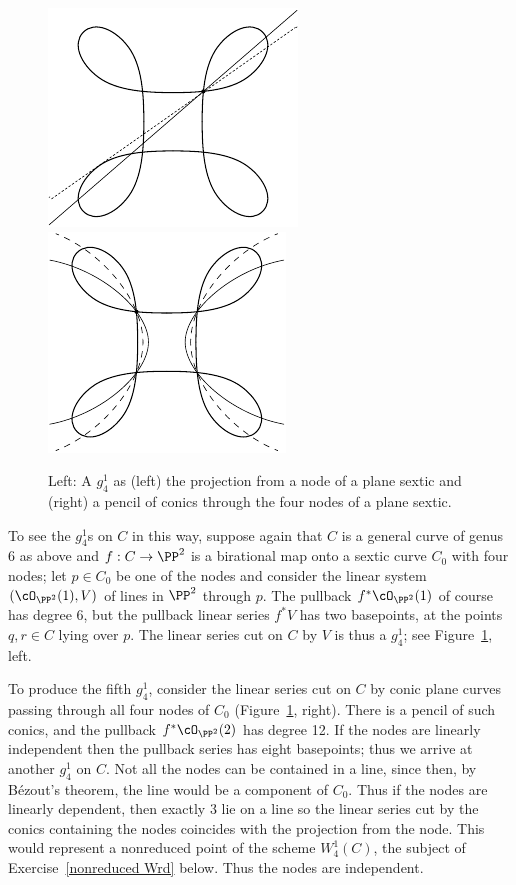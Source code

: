 \begin{figure}[b]
\hskip0pt
\hbox{\includegraphics[width=0.36\hsize]{main/Fig11-2-new}\quad}
\includegraphics[width=0.34\hsize]{main/Fig11-3}
\caption{Left: A $g^1_4$ as (left)
the projection from a node of a plane sextic 
and (right)
a pencil of conics through the four nodes of a
plane sextic.
}
\label{plane sextic 1}
\end{figure}

To see the $g^{1}_{4}$s on $C$ in this way,  suppose again that $C$ is a
general curve of genus 6 as above and $f : C \to \PP^2$ is a birational
map onto a sextic curve $C_0$ with four nodes; let $p \in C_0$ be one of
the nodes and consider the linear system $(\cO_{\PP^2}(1),V)$ of lines
in $\PP^2$ through $p$. The pullback $f^*\cO_{\PP^2}(1)$ of course has
degree 6, but the pullback linear series $f^*V$ has two basepoints,
at the points $q, r \in C$ lying over $p$. The linear series cut on $C$
by $V$ is thus a $g^1_4$; see Figure~\ref{plane sextic 1}, left.

To produce the fifth $g^1_4$, consider the linear series cut on
$C$ by conic plane curves passing through all four nodes of $C_0$
(Figure~\ref{plane sextic 1}, right).  There is a pencil of such conics, and
the pullback $f^*\cO_{\PP^2}(2)$ has degree 12.
If the nodes are linearly independent then the pullback series has eight
basepoints; thus we arrive at another $g^1_4$ on $C$.  Not all the nodes
can be contained in a line, since then, by B\'ezout's theorem, the line
would be a component of $C_0$. Thus if the nodes are linearly dependent,
then exactly 3 lie on a line
so the linear series cut by the conics containing the nodes coincides
with the projection from the 
node.
This would represent a nonreduced point of the scheme $W^1_4(C)$,
the subject of Exercise~\ref{nonreduced Wrd} below. Thus the nodes
are independent.

